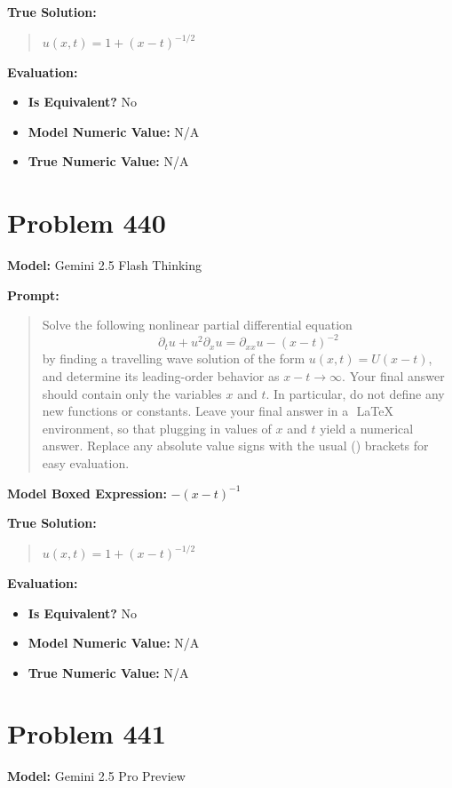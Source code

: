 \documentclass{article}
\begin{document}
\textbf{True Solution:}
\begin{quote}
$u(x,t) = 1 + (x-t)^{-1/2}$
\end{quote}

\textbf{Evaluation:}
\begin{itemize}
\item \textbf{Is Equivalent?} No
\item \textbf{Model Numeric Value:} N/A
\item \textbf{True Numeric Value:} N/A
\end{itemize}
\vspace{1cm}
\section*{Problem 440}
\textbf{Model:} Gemini 2.5 Flash Thinking

\textbf{Prompt:}
\begin{quote}
Solve the following nonlinear partial differential equation $$ \partial_t u + u^2 \partial_x u = \partial_{xx}u - (x-t)^{-2} $$ by finding a travelling wave solution of the form $u(x,t) = U(x-t)$, and determine its leading-order behavior as $x-t \to \infty$. Your final answer should contain only the variables $x$ and $t$. In particular, do not define any new functions or constants. Leave your final answer in a $\boxed{}$ LaTeX environment, so that plugging in values of $x$ and $t$ yield a numerical answer. Replace any absolute value signs with the usual () brackets for easy evaluation.
\end{quote}
\textbf{Model Boxed Expression:} $-(x-t)^{-1}$

\textbf{True Solution:}
\begin{quote}
$u(x,t) = 1 + (x-t)^{-1/2}$
\end{quote}

\textbf{Evaluation:}
\begin{itemize}
\item \textbf{Is Equivalent?} No
\item \textbf{Model Numeric Value:} N/A
\item \textbf{True Numeric Value:} N/A
\end{itemize}
\vspace{1cm}
\section*{Problem 441}
\textbf{Model:} Gemini 2.5 Pro Preview
\end{document}
